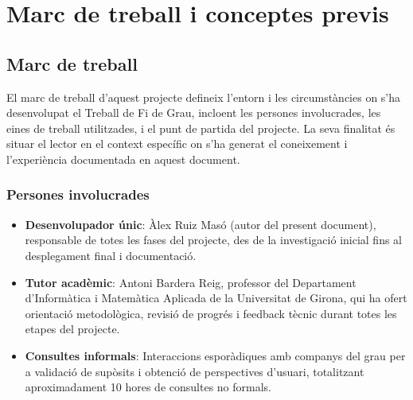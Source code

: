 

\chapter{Marc de treball i conceptes previs}
\label{Ch:Framework}

\section{Marc de treball}

El marc de treball d'aquest projecte defineix l'entorn i les circumstàncies
on s'ha desenvolupat el Treball de Fi de Grau, incloent les persones
involucrades, les eines de treball utilitzades, i el punt de partida del
projecte. La seva finalitat és situar el lector en el context específic
on s'ha generat el coneixement i l'experiència documentada en aquest
document.

\subsection{Persones involucrades}
\begin{itemize}
    \item \textbf{Desenvolupador únic}: Àlex Ruiz Masó (autor del present document), responsable de totes les fases del projecte, des de la investigació inicial fins al desplegament final i documentació.
    \item \textbf{Tutor acadèmic}: Antoni Bardera Reig, professor del Departament d'Informàtica i Matemàtica Aplicada de la Universitat de Girona, qui ha ofert orientació metodològica, revisió de progrés i feedback tècnic durant totes les etapes del projecte.
    \item \textbf{Consultes informals}: Interaccions esporàdiques amb companys del grau per a validació de supòsits i obtenció de perspectives d'usuari, totalitzant aproximadament 10 hores de consultes no formals.
\end{itemize}

